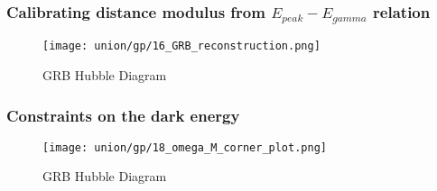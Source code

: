 \subsubsection{Calibrating distance modulus from $E_{peak}-E_{gamma}$ relation}
\begin{figure}[H]
	\centering
	\texttt{[image: union/gp/16\_GRB\_reconstruction.png]}
	\caption{GRB Hubble Diagram}
	\label{fig:HD_GRB_GP_union}
\end{figure}
\subsubsection{Constraints on the dark energy}
\begin{figure}[H]
	\centering
	\texttt{[image: union/gp/18\_omega\_M\_corner\_plot.png]}
	\caption{GRB Hubble Diagram}
	\label{fig:OmegaM_GP_union}
\end{figure}